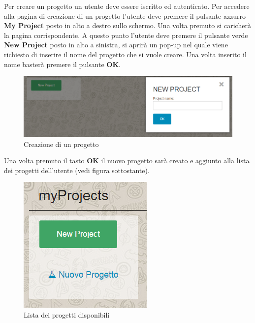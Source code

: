 Per creare un progetto un utente deve essere iscritto ed autenticato. Per accedere alla pagina di creazione di un progetto l'utente deve premere il pulsante azzurro \textbf{My Project} posto in alto a destro sullo schermo. Una volta premuto si caricherà la pagina corrispondente. A questo punto l'utente deve premere il pulsante verde \textbf{New Project} posto in alto a sinistra, si aprirà un pop-up nel quale viene richiesto di inserire il nome del progetto che si vuole creare. Una volta inserito il nome basterà premere il pulsante \textbf{OK}.

\begin{figure}[H] 
	\centering 
	\includegraphics[scale=0.40] {img/newproject.png}
	\caption{Creazione di un progetto} 
\end{figure}

\noindent Una volta premuto il tasto \textbf{OK} il nuovo progetto sarà creato e aggiunto alla lista dei progetti dell'utente (vedi figura sottostante).


\begin{figure}[H] 
	\centering 
	\includegraphics[scale=0.60] {img/projectlist.png}
	\caption{Lista dei progetti disponibili} 
\end{figure}